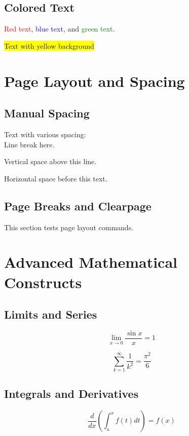 \documentclass[12pt]{article}
\begin{document}
\subsection{Colored Text}
\textcolor{red}{Red text}, \textcolor{blue}{blue text}, and \textcolor{green}{green text}.

\colorbox{yellow}{Text with yellow background}

\section{Page Layout and Spacing}

\subsection{Manual Spacing}
Text with various spacing:\\ 
Line break here.

\vspace{1cm}
Vertical space above this line.

\hspace{2cm}Horizontal space before this text.

\subsection{Page Breaks and Clearpage}
This section tests page layout commands.

\newpage

\section{Advanced Mathematical Constructs}

\subsection{Limits and Series}
\begin{equation}
\lim_{x \to 0} \frac{\sin x}{x} = 1
\end{equation}

\begin{equation}
\sum_{k=1}^{\infty} \frac{1}{k^2} = \frac{\pi^2}{6}
\end{equation}

\subsection{Integrals and Derivatives}
\begin{equation}
\frac{d}{dx}\left(\int_a^x f(t) dt\right) = f(x)
\end{equation}
\end{document}
